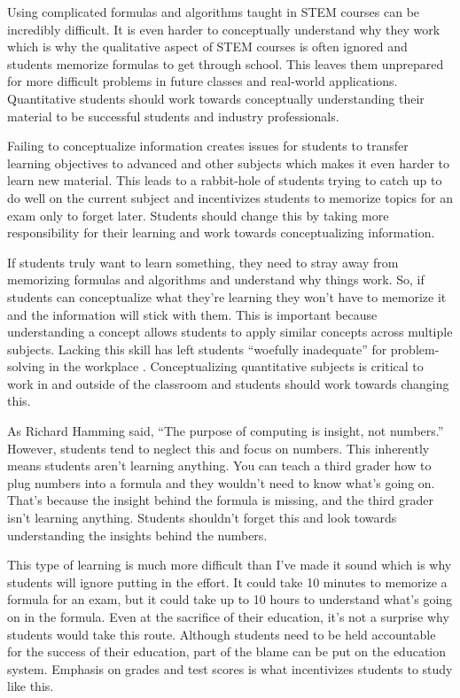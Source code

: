 \documentclass[11pt,]{article}
\begin{document}
Using complicated formulas and algorithms taught in STEM courses can be
incredibly difficult. It is even harder to conceptually understand why
they work which is why the qualitative aspect of STEM courses is often
ignored and students memorize formulas to get through school. This
leaves them unprepared for more difficult problems in future classes and
real-world applications. Quantitative students should work towards
conceptually understanding their material to be successful students and
industry professionals.

Failing to conceptualize information creates issues for students to
transfer learning objectives to advanced and other subjects which makes
it even harder to learn new material. This leads to a rabbit-hole of
students trying to catch up to do well on the current subject and
incentivizes students to memorize topics for an exam only to forget
later. Students should change this by taking more responsibility for
their learning and work towards conceptualizing information.

If students truly want to learn something, they need to stray away from
memorizing formulas and algorithms and understand why things work. So,
if students can conceptualize what they're learning they won't have to
memorize it and the information will stick with them. This is important
because understanding a concept allows students to apply similar
concepts across multiple subjects. Lacking this skill has left students
``woefully inadequate'' for problem-solving in the workplace
\citet{bottge1999}. Conceptualizing quantitative subjects is critical to
work in and outside of the classroom and students should work towards
changing this.

As Richard Hamming said, ``The purpose of computing is insight, not
numbers.'' However, students tend to neglect this and focus on numbers.
This inherently means students aren't learning anything. You can teach a
third grader how to plug numbers into a formula and they wouldn't need
to know what's going on. That's because the insight behind the formula
is missing, and the third grader isn't learning anything. Students
shouldn't forget this and look towards understanding the insights behind
the numbers.

This type of learning is much more difficult than I've made it sound
which is why students will ignore putting in the effort. It could take
10 minutes to memorize a formula for an exam, but it could take up to 10
hours to understand what's going on in the formula. Even at the
sacrifice of their education, it's not a surprise why students would
take this route. Although students need to be held accountable for the
success of their education, part of the blame can be put on the
education system. Emphasis on grades and test scores is what
incentivizes students to study like this.
\end{document}
